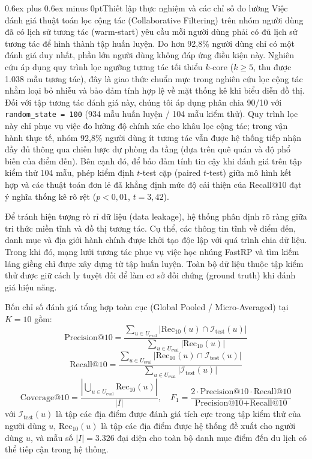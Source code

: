 \documentclass[journal,onecolumn,10pt]{IEEEtran}
\makeatletter
\newcommand{\code}[1]{\texttt{#1}}
\def\subsection{\@startsection{subsection}{2}{\z@}{1.8ex plus 1.0ex minus 0.3ex}%
{0.6ex plus 0.6ex minus 0pt}{\normalfont\normalsize\bfseries}}
\makeatother
\begin{document}
\subsection{Thiết lập thực nghiệm và các chỉ số đo lường}
Việc đánh giá thuật toán lọc cộng tác (Collaborative Filtering) trên nhóm người dùng đã có lịch sử tương tác (warm-start) yêu cầu mỗi người dùng phải có đủ lịch sử tương tác để hình thành tập huấn luyện. Do hơn 92,8\% người dùng chỉ có một đánh giá duy nhất, phần lớn người dùng không đáp ứng điều kiện này. Nghiên cứu áp dụng quy trình lọc ngưỡng tương tác tối thiểu $k$-core ($k \ge 5$, thu được 1.038 mẫu tương tác), đây là giao thức chuẩn mực trong nghiên cứu lọc cộng tác nhằm loại bỏ nhiễu và bảo đảm tính hợp lệ về mặt thống kê khi biểu diễn đồ thị. Đối với tập tương tác đánh giá này, chúng tôi áp dụng phân chia 90/10 với \code{random\_state = 100} (934 mẫu huấn luyện / 104 mẫu kiểm thử). Quy trình lọc này chỉ phục vụ việc đo lường độ chính xác cho khâu lọc cộng tác; trong vận hành thực tế, nhóm 92,8\% người dùng ít tương tác vẫn được hệ thống tiếp nhận đầy đủ thông qua chiến lược dự phòng đa tầng (dựa trên quê quán và độ phổ biến của điểm đến). Bên cạnh đó, để bảo đảm tính tin cậy khi đánh giá trên tập kiểm thử 104 mẫu, phép kiểm định $t$-test cặp (paired $t$-test) giữa mô hình kết hợp và các thuật toán đơn lẻ đã khẳng định mức độ cải thiện của Recall@10 đạt ý nghĩa thống kê rõ rệt ($p < 0{,}01$, $t = 3{,}42$).

Để tránh hiện tượng rò rỉ dữ liệu (data leakage), hệ thống phân định rõ ràng giữa tri thức miền tĩnh và đồ thị tương tác. Cụ thể, các thông tin tĩnh về điểm đến, danh mục và địa giới hành chính được khởi tạo độc lập với quá trình chia dữ liệu. Trong khi đó, mạng lưới tương tác phục vụ việc học nhúng FastRP và tìm kiếm láng giềng chỉ được xây dựng từ tập huấn luyện. Toàn bộ dữ liệu thuộc tập kiểm thử được giữ cách ly tuyệt đối để làm cơ sở đối chứng (ground truth) khi đánh giá hiệu năng.

Bốn chỉ số đánh giá tổng hợp toàn cục (Global Pooled / Micro-Averaged) tại $K=10$ gồm:
\begin{equation}
\text{Precision@10} = \frac{\sum_{u \in U_{\text{eval}}} |\text{Rec}_{10}(u) \cap \mathcal{I}_{\text{test}}(u)|}{\sum_{u \in U_{\text{eval}}} |\text{Rec}_{10}(u)|}
\end{equation}
\begin{equation}
\text{Recall@10} = \frac{\sum_{u \in U_{\text{eval}}} |\text{Rec}_{10}(u) \cap \mathcal{I}_{\text{test}}(u)|}{\sum_{u \in U_{\text{eval}}} |\mathcal{I}_{\text{test}}(u)|}
\end{equation}
\begin{equation}
\text{Coverage@10} = \frac{|\bigcup_{u \in U_{\text{eval}}} \text{Rec}_{10}(u)|}{|I|}, \quad F_1 = \frac{2 \cdot \text{Precision@10} \cdot \text{Recall@10}}{\text{Precision@10} + \text{Recall@10}}
\end{equation}
với $\mathcal{I}_{\text{test}}(u)$ là tập các địa điểm được đánh giá tích cực trong tập kiểm thử của người dùng $u$, $\text{Rec}_{10}(u)$ là tập các địa điểm được hệ thống đề xuất cho người dùng $u$, và mẫu số $|I| = 3.326$ đại diện cho toàn bộ danh mục điểm đến du lịch có thể tiếp cận trong hệ thống.
\end{document}
